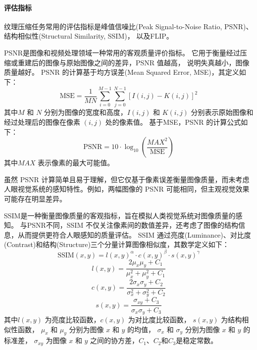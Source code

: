\paragraph{评估指标}

纹理压缩任务常用的评估指标是峰值信噪比(Peak Signal-to-Noise Ratio, PSNR)、
结构相似性\cite{wang2004image}(Structural Similarity, SSIM)，
以及FLIP\cite{andersson2020flip}。

PSNR是图像和视频处理领域一种常用的客观质量评价指标。
它用于衡量经过压缩或重建后的图像与原始图像之间的差异，PSNR 值越高，
说明失真越小，图像质量越好。
PSNR 的计算基于均方误差(Mean Squared Error, MSE)，其定义如下：
\begin{equation}
\text{MSE} = \frac{1}{MN} \sum_{i=0}^{M-1} \sum_{j=0}^{N-1} \left[ I(i,j) - K(i,j) \right]^2
\end{equation}
其中$M$ 和 $N$ 分别为图像的宽度和高度，$I(i,j)$ 和 $K(i,j)$ 分别表示原始图像和经过处理后的图像在像素 $(i,j)$ 处的像素值。
基于MSE，PSNR 的计算公式如下：
\begin{equation}
    \text{PSNR} = 10 \cdot \log_{10} \left( \frac{MAX^2}{\text{MSE}} \right)
\end{equation}
其中$MAX$ 表示像素的最大可能值。

虽然 PSNR 计算简单且易于理解，但它仅基于像素误差衡量图像质量，而未考虑人眼视觉系统的感知特性。例如，两幅图像的 PSNR 可能相同，但主观视觉效果可能存在明显差异。

SSIM\cite{wang2004image}是一种衡量图像质量的客观指标，旨在模拟人类视觉系统对图像质量的感知。
与PSNR不同，SSIM 不仅关注像素间的数值差异，还考虑了图像的结构信息，从而提供更符合人眼感知的质量评估。
SSIM 通过亮度(Luminance)、对比度(Contrast)和结构(Structure)三个分量计算图像相似度，其数学定义如下：
\begin{equation}
\text{SSIM}(x, y) = l(x, y)^\alpha \cdot c(x, y)^\beta \cdot s(x, y)^\gamma
\end{equation}
\begin{equation}
l(x, y) = \frac{2\mu_x\mu_y + C_1}{\mu_x^2 + \mu_y^2 + C_1}
\end{equation}
\begin{equation}
c(x, y) = \frac{2\sigma_x\sigma_y + C_2}{\sigma_x^2 + \sigma_y^2 + C_2}
\end{equation}
\begin{equation}
s(x, y) = \frac{\sigma_{xy} + C_3}{\sigma_x \sigma_y + C_3}
\end{equation}
其中$l(x, y)$ 为亮度比较函数，$c(x, y)$ 为对比度比较函数，
$s(x, y)$ 为结构相似性函数，
$\mu_x$ 和 $\mu_y$ 分别为图像 $x$ 和 $y$ 的均值，
$\sigma_x$ 和 $\sigma_y$ 分别为图像 $x$ 和 $y$ 的标准差，
$\sigma_{xy}$ 为图像 $x$ 和 $y$ 之间的协方差，$C_1$、$C_2$和$C_3$是稳定常数。

